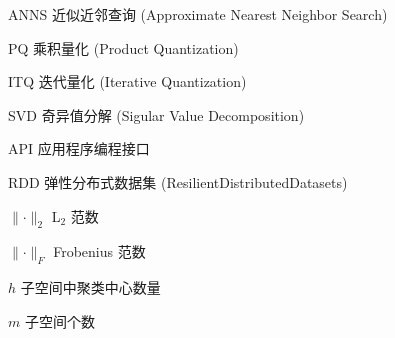 \begin{denotation}

\item[ANNS] 近似近邻查询 (Approximate Nearest Neighbor Search)
\item[PQ] 乘积量化 (Product Quantization)
\item[ITQ] 迭代量化 (Iterative Quantization)
\item[SVD] 奇异值分解 (Sigular Value Decomposition)
\item[API] 应用程序编程接口
\item[RDD] 弹性分布式数据集 (ResilientDistributedDatasets)
\item[$\lVert\cdot\rVert_2$] L$_2$ 范数
\item[$\lVert\cdot\rVert_F$] Frobenius 范数
\item[$h$] 子空间中聚类中心数量
\item[$m$] 子空间个数
\end{denotation}
